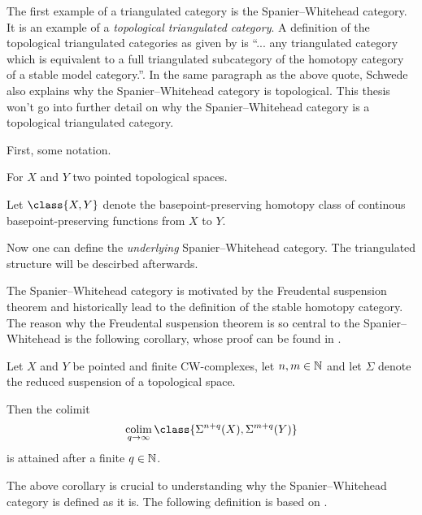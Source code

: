 The first example of a triangulated category is the Spanier--Whitehead category. It is an example of a \emph{topological triangulated category}. A definition of the topological triangulated categories as given by \cite[At the top of p. 6 in the standalone article]{Schwede_2010} is ``... any triangulated category which is equivalent to a full triangulated subcategory of the homotopy category of a stable model category.''. In the same paragraph as the above quote, Schwede also explains why the Spanier--Whitehead category is topological. This thesis won't go into further detail on why the Spanier--Whitehead category is a topological triangulated category.

First, some notation.
\begin{notation}
    For \( X \) and \( Y \) two pointed topological spaces.

    Let \( \class{ X, Y } \) denote the basepoint-preserving homotopy class of continous basepoint-preserving functions from \( X \) to \( Y \).
\end{notation}

Now one can define the \emph{underlying} Spanier--Whitehead category. The triangulated structure will be descirbed afterwards.

The Spanier--Whitehead category is motivated by the Freudental suspension theorem and historically lead to the definition of the stable homotopy category. The reason why the Freudental suspension theorem is so central to the Spanier--Whitehead is the following corollary, whose proof can be found in \cite[Remark 5.2]{Daria_Bachelor}.

\begin{corollary}
    \label{cor:sw_freudenthal_suspension}
    Let \( X \) and \( Y \) be pointed and finite CW-complexes, let \( n, m \in {\mathbb{N}} \) and let \( \Sigma \) denote the reduced suspension of a topological space.
    
    Then the colimit
    \[
        \colim_{q \to \infty} \class{ \Sigma^{n + q}(X), \Sigma^{m + q}(Y) }
    \]
    is attained after a finite \( q \in {\mathbb{N}} \).
\end{corollary}

The above corollary is crucial to understanding why the Spanier--Whitehead category is defined as it is. The following definition is based on \cite[Definition 2]{Schwede_2010}.

